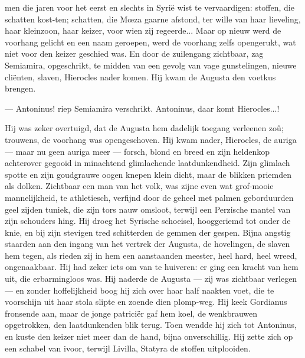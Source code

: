 \documentclass[a4paper, 12pt, oneside, dutch]{article}
\begin{document}
men die jaren voor het eerst en slechts in Syrië wist te vervaardigen: stoffen, die schatten kost-ten; schatten, die Mœza gaarne afstond, ter wille van haar lieveling, haar kleinzoon, haar keizer, voor wien zij regeerde... Maar op nieuw werd de voorhang gelicht en een naam geroepen, werd de voorhang zelfs opengerukt, wat niet voor den keizer geschied was. En door de zuilengang zichtbaar, zag Semiamira, opgeschrikt, te midden van een gevolg van vage gunstelingen, nieuwe cliënten, slaven, Hierocles nader komen. Hij kwam de Augusta den voetkus brengen.

--- Antoninus! riep Semiamira verschrikt. Antoninus, daar komt Hierocles...!

Hij was zeker overtuigd, dat de Augusta hem dadelijk toegang verleenen zoû; trouwens, de voorhang was opengeschoven. Hij kwam nader, Hierocles, de auriga --- maar nu geen auriga meer --- forsch, blond en breed en zijn heldenkop achterover gegooid in minachtend glimlachende laatdunkendheid. Zijn glimlach spotte en zijn goudgrauwe oogen knepen klein dicht, maar de blikken priemden als dolken. Zichtbaar een man van het volk, was zijne even wat grof-mooie mannelijkheid, te athletiesch, verfijnd door de geheel met palmen geborduurden geel zijden tuniek, die zijn tors nauw omsloot, terwijl een Perzische mantel van zijn schouders hing. Hij droeg het Syrische schoeisel, hooggeriemd tot onder de knie, en bij zijn stevigen tred schitterden de gemmen der gespen. Bijna angstig staarden aan den ingang van het vertrek der Augusta, de hovelingen, de slaven hem tegen, als rieden zij in hem een aanstaanden meester, heel hard, heel wreed, ongenaakbaar. Hij had zeker iets om van te huiveren: er ging een kracht van hem uit, die erbarmingloos was. Hij naderde de Augusta --- zij was zichtbaar verlegen --- en zonder hoffelijkheid boog hij zich over haar half naakten voet, die te voorschijn uit haar stola slipte en zoende dien plomp-weg. Hij keek Gordianus fronsende aan, maar de jonge patriciër gaf hem koel, de wenkbrauwen opgetrokken, den laatdunkenden blik terug. Toen wendde hij zich tot Antoninus, en kuste den keizer niet meer dan de hand, bijna onverschillig. Hij zette zich op een schabel van ivoor, terwijl Livilla, Statyra de stoffen uitplooiden.
\end{document}
